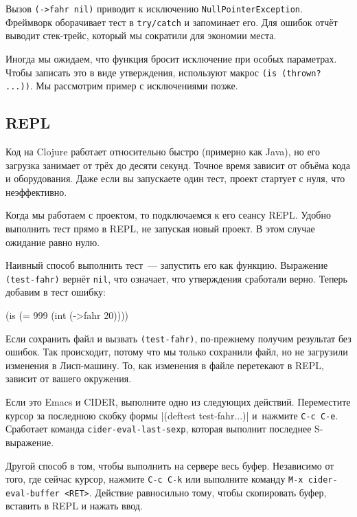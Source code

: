 \fi


Вызов \verb|(->fahr nil)| приводит к исключению
\texttt{Null\-Pointer\-Exception}. Фреймворк оборачивает тест в \verb|try/catch|
и запоминает его. Для ошибок отчёт выводит стек-трейс, который мы сократили для
экономии места.

Иногда мы ожидаем, что функция бросит исключение при особых параметрах. Чтобы
записать это в виде утверждения, используют макрос \verb|(is (thrown? ...))|. Мы
рассмотрим пример с исключениями позже.

\subsection{REPL}


Код на Clojure работает относительно быстро (примерно как Java), но его загрузка
занимает от трёх до десяти секунд. Точное время зависит от объёма кода и
оборудования. Даже если вы запускаете один тест, проект стартует с нуля, что
неэффективно.

Когда мы работаем с проектом, то подключаемся к его сеансу REPL. Удобно
выполнить тест прямо в REPL, не запуская новый проект. В этом случае ожидание
равно нулю.

Наивный способ выполнить тест~--- запустить его как функцию. Выражение
\verb|(test-fahr)| вернёт \verb|nil|, что означает, что утверждения
сработали верно. Теперь добавим в тест ошибку:

\begin{english}
  \begin{clojure}
(is (= 999 (int (->fahr 20))))
  \end{clojure}
\end{english}

Если сохранить файл и вызвать \verb|(test-fahr)|, по-прежнему получим результат
без ошибок. Так происходит, потому что мы только сохранили файл, но не загрузили
изменения в Лисп-машину. То, как изменения в файле перетекают в REPL, зависит от
вашего окружения.


Если это Emacs и CIDER, выполните одно из следующих действий. Переместите курсор
за последнюю скобку формы \spverb|(deftest test-fahr...)| и~нажмите
\verb|C-c C-e|. Сработает команда \texttt{cider\--eval-last-sexp}, которая
выполнит последнее S-выражение.

Другой способ в том, чтобы выполнить на сервере весь буфер. Независимо от того,
где сейчас курсор, нажмите \verb|C-c C-k| или выполните команду
\verb|M-x cider-eval-buffer <RET>|. Действие равносильно тому, чтобы скопировать
буфер, вставить в REPL и нажать ввод.

